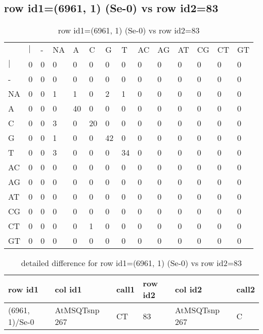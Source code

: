 \subsection{row id1=(6961, 1) (Se-0) vs row id2=83}
\begin{center}
\begin{longtable}{|l|l|l|l|l|l|l|l|l|l|l|l|l|l|}
\caption{row id1=(6961, 1) (Se-0) vs row id2=83} \label{table_dm172}\\
\hline
\\
\hline
&$|$&-&NA&A&C&G&T&AC&AG&AT&CG&CT&GT\\
$|$&0&0&0&0&0&0&0&0&0&0&0&0&0\\
-&0&0&0&0&0&0&0&0&0&0&0&0&0\\
NA&0&0&1&1&0&2&1&0&0&0&0&0&0\\
A&0&0&0&40&0&0&0&0&0&0&0&0&0\\
C&0&0&3&0&20&0&0&0&0&0&0&0&0\\
G&0&0&1&0&0&42&0&0&0&0&0&0&0\\
T&0&0&3&0&0&0&34&0&0&0&0&0&0\\
AC&0&0&0&0&0&0&0&0&0&0&0&0&0\\
AG&0&0&0&0&0&0&0&0&0&0&0&0&0\\
AT&0&0&0&0&0&0&0&0&0&0&0&0&0\\
CG&0&0&0&0&0&0&0&0&0&0&0&0&0\\
CT&0&0&0&0&1&0&0&0&0&0&0&0&0\\
GT&0&0&0&0&0&0&0&0&0&0&0&0&0\\
\hline
\end{longtable}
\end{center}

\begin{center}
\begin{longtable}{|l|l|l|l|l|l|}
\caption{detailed difference for row id1=(6961, 1) (Se-0) vs row id2=83} \label{table_dm173}\\
\hline
row id1&col id1&call1&row id2&col id2&call2\\
\hline
(6961, 1)/Se-0&AtMSQTsnp 267&CT&83&AtMSQTsnp 267&C\\
\hline
\end{longtable}
\end{center}

